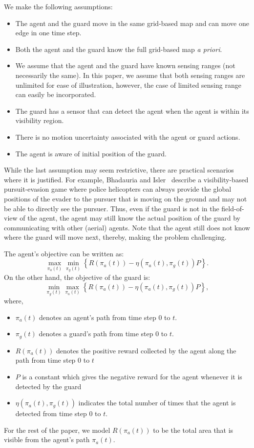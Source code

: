\documentclass[10 pt, conference]{ieeeconf}
\begin{document}
We make the following assumptions:
\begin{itemize}
\item The agent and the guard move in the same grid-based map and can move one edge in one time step.
\item Both the agent and the guard know the full grid-based map \emph{a priori}.
\item We assume that the agent and the guard have known sensing ranges (not necessarily the same). In this paper, we assume that both sensing ranges are unlimited for ease of illustration, however, the case of limited sensing range can easily be incorporated. 
\item The guard has a sensor that can detect the agent when the agent is within its visibility region.
\item There is no motion uncertainty associated with the agent or guard actions. 
\item The agent is aware of initial position of the guard.
\end{itemize}
While the last assumption may seem restrictive, there are practical scenarios where it is justified. For example, Bhadauria and Isler~\cite{bhadauria2011capturing} describe a visibility-based pursuit-evasion game where police helicopters can always provide the global positions of the evader to the pursuer that is moving on the ground and may not be able to directly see the pursuer. Thus, even if the guard is not in the field-of-view of the agent, the agent may still know the actual position of the guard by communicating with other (aerial) agents. Note that the agent still does not know where the guard will move next, thereby, making the problem challenging.

The agent's objective can be written as:
\begin{equation}
\max_{\pi_a(t)} \min_{\pi_g(t)} \left\{ R(\pi_a(t))  - \eta(\pi_a(t),\pi_g(t)) P \right\}.
\label{ob_function}
\end{equation}
On the other hand, the objective of the guard is:
\begin{equation}
 \min_{\pi_g(t)} \max_{\pi_a(t)} \left\{ R(\pi_a(t))  - \eta(\pi_a(t),\pi_g(t)) P \right\},
\end{equation}
where,
\begin{itemize}
\item $\pi_a(t)$ denotes an agent's path from time step $0$ to $t$. 
\item $\pi_g(t)$ denotes a guard's path from time step $0$ to $t$. 
\item $R(\pi_a(t))$ denotes the positive reward collected by the agent along the path from time step $0$ to $t$  
\item $P$ is a constant which gives the negative reward for the agent whenever it is detected by the guard
\item $\eta(\pi_a(t),\pi_g(t)) $ indicates the total number of times that the agent is detected from time step $0$ to $t$.
\end{itemize}
For the rest of the paper, we model $R(\pi_a(t))$ to be the total area that is visible from the agent's path $\pi_a(t)$.
\end{document}
